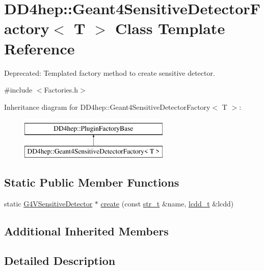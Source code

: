 \hypertarget{class_d_d4hep_1_1_geant4_sensitive_detector_factory}{}\section{D\+D4hep\+:\+:Geant4\+Sensitive\+Detector\+Factory$<$ T $>$ Class Template Reference}
\label{class_d_d4hep_1_1_geant4_sensitive_detector_factory}


Deprecated\+: Templated factory method to create sensitive detector.  




{\ttfamily \#include $<$Factories.\+h$>$}

Inheritance diagram for D\+D4hep\+:\+:Geant4\+Sensitive\+Detector\+Factory$<$ T $>$\+:\begin{figure}[H]
\begin{center}
\leavevmode
\includegraphics[height=2.000000cm]{class_d_d4hep_1_1_geant4_sensitive_detector_factory}
\end{center}
\end{figure}
\subsection*{Static Public Member Functions}
\begin{DoxyCompactItemize}
\item 
static \hyperlink{class_g4_v_sensitive_detector}{G4\+V\+Sensitive\+Detector} $\ast$ \hyperlink{class_d_d4hep_1_1_geant4_sensitive_detector_factory_a2a64f7e0f2f4ca7076b273b7725b6717}{create} (const \hyperlink{struct_d_d4hep_1_1_plugin_factory_base_aaa4c6d8801f70db2776c5473abc92692}{str\+\_\+t} \&name, \hyperlink{struct_d_d4hep_1_1_plugin_factory_base_a61b840cc18cdd24ae2e383da306b9c9a}{lcdd\+\_\+t} \&lcdd)
\end{DoxyCompactItemize}
\subsection*{Additional Inherited Members}


\subsection{Detailed Description}
